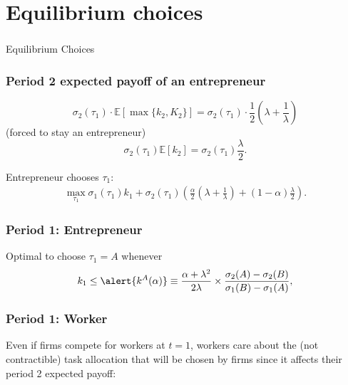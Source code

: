 \documentclass[slides,english,compress]{beamer}
\begin{document}
\section{Equilibrium choices}
\begin{frame}
	\frametitle{}
	\begin{center}%
		\Large Equilibrium Choices
	\end{center}
\end{frame}
\begin{frame}
	\frametitle{Period 2 expected payoff of an entrepreneur}
\begin{block}{}
%
	\[\sigma_2(\tau_1) \cdot \mathbb E[\max\{k_2,K_2\}]=\sigma_2(\tau_1) \cdot \frac{1}{2} \left( \lambda + \frac{1}{\lambda} \right)
	\]
 (forced to stay an entrepreneur) \[\sigma_2(\tau_1)\mathbb E[k_2]=\sigma_2(\tau_1)\frac{\lambda}{2}.\]
\end{block}	
\pause
Entrepreneur chooses $\tau_1$:
\begin{align*} 
\max_{\tau_1}\sigma_1(\tau_1) k_1+  \sigma_2(\tau_1)  \left(  \frac{\alpha}{2} \left( \lambda + \frac{1}{\lambda} \right) + (1-\alpha) \frac{\lambda}{2} \right).
\end{align*}
\end{frame}
\begin{frame}
	\frametitle{Period 1: Entrepreneur}


Optimal to choose $\tau_1=A$ whenever
\begin{align*}\label{eq: optimal entrepreneur}
k_1\leq \alert{k^A(\alpha)} \equiv   \frac{\alpha+\lambda^2}{2\lambda}\times\frac{\sigma_2(A)-\sigma_2(B)}{\sigma_1(B)-\sigma_1(A)},
\end{align*}

\vspace{1cm}
\end{frame}
\begin{frame}
	\frametitle{Period 1: Worker}
Even if firms compete for workers at $t=1$, workers care about the (not contractible) task allocation that will be chosen by firms since it affects their period 2 expected payoff:
\end{frame}
\end{document}
